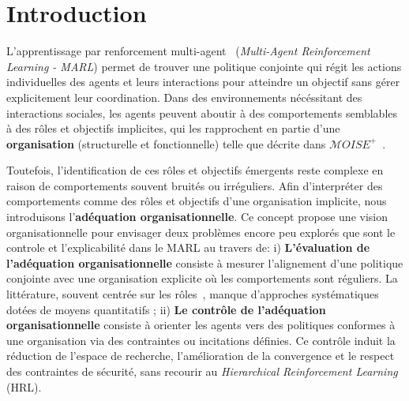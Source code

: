 \documentclass[francais,ROIA,Unicode,manuscript]{cedram}
\title
[MOISE+MARL]
{Une approche organisationnelle pour améliorer l’explicabilité et le contrôle dans l’apprentissage par renforcement multi-agent}
\author{\firstname{Julien} \lastname{Soulé}}
\author{\firstname{Michel} \lastname{Occello}}
\author{\firstname{Jean-Paul} \lastname{Jamont}}
\author{\firstname{Louis-Marie} \lastname{Traonouez}}
\author{\firstname{Paul} \lastname{Théron}}
\begin{document}
\maketitle


\section{Introduction}


L'apprentissage par renforcement multi-agent~\cite{maisonhaute2024} (\textit{Multi-Agent Reinforcement Learning - MARL}) permet de trouver une politique conjointe qui régit les actions individuelles des agents et leurs interactions pour atteindre un objectif sans gérer explicitement leur coordination. Dans des environnements nécéssitant des interactions sociales, les agents peuvent aboutir à des comportements semblables à des rôles et objectifs implicites, qui les rapprochent en partie d'une \textbf{organisation} (structurelle et fonctionnelle) telle que décrite dans $\mathcal{M}OISE^+$~\cite{Hubner2007}.

Toutefois, l’identification de ces rôles et objectifs émergents reste complexe en raison de comportements souvent bruités ou irréguliers. Afin d’interpréter des comportements comme des rôles et objectifs d'une organisation implicite, nous introduisons l’\textbf{adéquation organisationnelle}.
Ce concept propose une vision organisationnelle pour envisager deux problèmes encore peu explorés que sont le controle et l'explicabilité dans le MARL au travers de:
i) \textbf{L'évaluation de l'adéquation organisationnelle} consiste à mesurer l'alignement d'une politique conjointe avec une organisation explicite où les comportements sont réguliers. La littérature, souvent centrée sur les rôles~\cite{Isakov2024, Wen2024, Xie2024}, manque d'approches systématiques dotées de moyens quantitatifs
; \quad
ii) \textbf{Le contrôle de l'adéquation organisationnelle} consiste à orienter les agents vers des politiques conformes à une organisation via des contraintes ou incitations définies. Ce contrôle induit la réduction de l'espace de recherche, l'amélioration de la convergence et le respect des contraintes de sécurité, sans recourir au \textit{Hierarchical Reinforcement Learning} (HRL).
\end{document}
